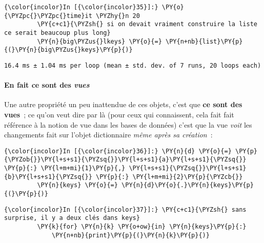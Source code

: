     \begin{Verbatim}[commandchars=\\\{\},frame=single,framerule=0.3mm,rulecolor=\color{cellframecolor}]
{\color{incolor}In [{\color{incolor}35}]:} \PY{o}{\PYZpc{}\PYZpc{}time}it \PYZhy{}n 20
         \PY{c+c1}{\PYZsh{} si on devait vraiment construire la liste ce serait beaucoup plus long}
         \PY{n}{big\PYZus{}lkeys} \PY{o}{=} \PY{n+nb}{list}\PY{p}{(}\PY{n}{big\PYZus{}keys}\PY{p}{)}
\end{Verbatim}


    \begin{Verbatim}[commandchars=\\\{\},frame=single,framerule=0.3mm,rulecolor=\color{cellframecolor}]
16.4 ms ± 1.04 ms per loop (mean ± std. dev. of 7 runs, 20 loops each)
\end{Verbatim}

    \hypertarget{en-fait-ce-sont-des-vues}{%
\paragraph{\texorpdfstring{En fait ce sont des
\emph{vues}}{En fait ce sont des vues}}\label{en-fait-ce-sont-des-vues}}

    Une autre propriété un peu inattendue de ces objets, c'est que
\textbf{ce sont des vues}~; ce qu'on veut dire par là (pour ceux qui
connaissent, cela fait fait référence à la notion de vue dans les bases
de données) c'est que la vue \emph{voit} les changements fait sur
l'objet dictionnaire \emph{même après sa création}~:

    \begin{Verbatim}[commandchars=\\\{\},frame=single,framerule=0.3mm,rulecolor=\color{cellframecolor}]
{\color{incolor}In [{\color{incolor}36}]:} \PY{n}{d} \PY{o}{=} \PY{p}{\PYZob{}}\PY{l+s+s1}{\PYZsq{}}\PY{l+s+s1}{a}\PY{l+s+s1}{\PYZsq{}} \PY{p}{:} \PY{l+m+mi}{1}\PY{p}{,} \PY{l+s+s1}{\PYZsq{}}\PY{l+s+s1}{b}\PY{l+s+s1}{\PYZsq{}} \PY{p}{:} \PY{l+m+mi}{2}\PY{p}{\PYZcb{}}
         \PY{n}{keys} \PY{o}{=} \PY{n}{d}\PY{o}{.}\PY{n}{keys}\PY{p}{(}\PY{p}{)}
\end{Verbatim}


    \begin{Verbatim}[commandchars=\\\{\},frame=single,framerule=0.3mm,rulecolor=\color{cellframecolor}]
{\color{incolor}In [{\color{incolor}37}]:} \PY{c+c1}{\PYZsh{} sans surprise, il y a deux clés dans keys}
         \PY{k}{for} \PY{n}{k} \PY{o+ow}{in} \PY{n}{keys}\PY{p}{:}
             \PY{n+nb}{print}\PY{p}{(}\PY{n}{k}\PY{p}{)}
\end{Verbatim}


